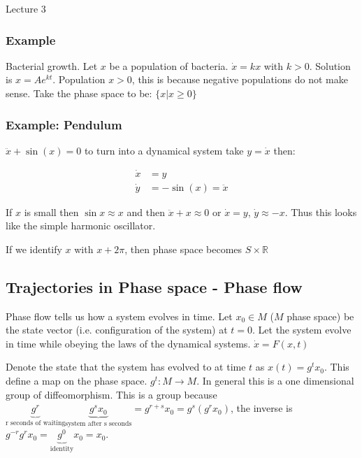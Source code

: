 \begin{center}

Lecture 3

\end{center}

\subsubsection*{Example}

Bacterial growth. Let $x$ be a population of bacteria. $\dot{x} = k x$ with $k > 0$. Solution is $x = A e^{kt}$. Population $x > 0$, this is because negative populations do not make sense. Take the phase space to be: $\{x | x \geq 0\}$

\subsubsection*{Example: Pendulum}

$\ddot{x} + \sin (x) = 0$ to turn into a dynamical system take $y=\dot{x}$ then:

\begin{align*}
\dot{x} &= y \\
\dot{y} &= - \sin (x) = \ddot{x}
\end{align*}

If $x$ is small then $\sin x \approx x$ and then $\ddot{x} + x \approx 0$ or $\dot{x} = y$, $\dot{y} \approx -x$. Thus this looks like the simple harmonic oscillator.


If we identify $x$ with $x + 2\pi$, then phase space becomes $S \times \mathbb{R}$

\subsection{Trajectories in Phase space - Phase flow}

Phase flow tells us how a system evolves in time. Let $x_0 \in M$ ($M$ phase space) be the state vector (i.e. configuration of the system) at $t=0$. Let the system evolve in time while obeying the laws of the dynamical systems. $\dot{x} = F (x, t)$

Denote the state that the system has evolved to at time $t$ as $x(t) = g^t x_0$. This define a map on the phase space. $g^t : M \rightarrow M$. In general this is a one dimensional group of diffeomorphism. This is a group because $\underbrace{g^r}_{\text{r seconds of waiting}} \underbrace{g^s x_0}_{\text{system after s seconds}} = g^{r+s} x_0 = g^s (g^r x_0)$, the inverse is $g^{-r} g^r x_0 = \underbrace{g^0}_{\text{identity}} x_0 = x_0$.

